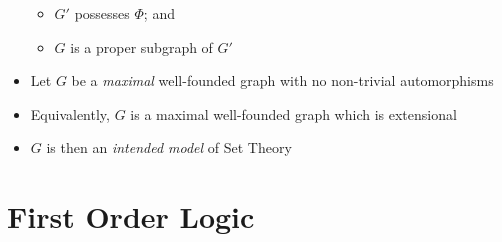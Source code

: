 \begin{itemize}
\begin{itemize}
		\item $ G' $ possesses $ \Phi $; and
		\item $ G $ is a proper subgraph of $ G' $
		
	\end{itemize}
	
	\item Let $ G $ be a \textit{maximal} well-founded graph with no non-trivial automorphisms
	
	\item Equivalently, $ G $ is a maximal well-founded graph which is extensional
	
	\item $ G $ is then an \textit{intended model} of Set Theory
	
\end{itemize}

\section{First Order Logic}

